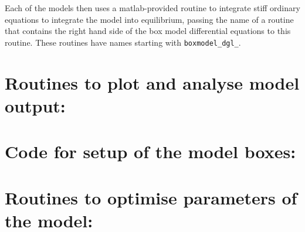 \documentclass[a4paper]{scrartcl}
\begin{document}
Each of the models then uses a matlab-provided routine to integrate
stiff ordinary equations to integrate the model into equilibrium,
passing the name of a routine that contains the right hand side of the
box model differential equations to this routine. These routines have
names starting with \verb+boxmodel_dgl_+.



\section{Routines to plot and analyse model output:}

\section{Code for setup of the model boxes:} 
\section{Routines to optimise parameters of the model:}
\end{document}
